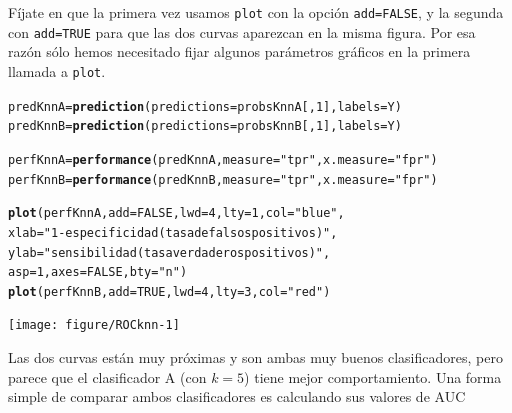 \documentclass[10pt,a4paper]{article}\usepackage[]{graphicx}\usepackage[]{color}
\makeatletter
\newcommand{\hlnum}[1]{\textcolor[rgb]{0.686,0.059,0.569}{#1}}%
\newcommand{\hlstr}[1]{\textcolor[rgb]{0.192,0.494,0.8}{#1}}%
\newcommand{\hlstd}[1]{\textcolor[rgb]{0.345,0.345,0.345}{#1}}%
\newcommand{\hlkwb}[1]{\textcolor[rgb]{0.69,0.353,0.396}{#1}}%
\newcommand{\hlkwc}[1]{\textcolor[rgb]{0.333,0.667,0.333}{#1}}%
\newcommand{\hlkwd}[1]{\textcolor[rgb]{0.737,0.353,0.396}{\textbf{#1}}}%
\newenvironment{kframe}{%
 \def\at@end@of@kframe{}%
 \ifinner\ifhmode%
  \def\at@end@of@kframe{\end{minipage}}%
  \begin{minipage}{\columnwidth}%
 \fi\fi%
 \def\FrameCommand##1{\hskip\@totalleftmargin \hskip-\fboxsep
 \colorbox{shadecolor}{##1}\hskip-\fboxsep
     \hskip-\linewidth \hskip-\@totalleftmargin \hskip\columnwidth}%
 \MakeFramed {\advance\hsize-\width
   \@totalleftmargin\z@ \linewidth\hsize
   \@setminipage}}%
 {\par\unskip\endMakeFramed%
 \at@end@of@kframe}
\newenvironment{knitrout}{}{} %
\makeatother
\begin{document}
Fíjate en que la primera vez usamos {\tt plot} con la opción {\tt add=FALSE}, y la segunda con {\tt add=TRUE} para que las dos curvas aparezcan en la misma figura. Por esa razón sólo hemos necesitado fijar algunos parámetros gráficos en la primera llamada a {\tt plot}.

\begin{knitrout}
\color{fgcolor}\begin{kframe}
\begin{alltt}
\hlstd{predKnnA} \hlkwb{=} \hlkwd{prediction}\hlstd{(}\hlkwc{predictions} \hlstd{= probsKnnA[,} \hlnum{1}\hlstd{],} \hlkwc{labels} \hlstd{= Y)}
\hlstd{predKnnB} \hlkwb{=} \hlkwd{prediction}\hlstd{(}\hlkwc{predictions} \hlstd{= probsKnnB[,} \hlnum{1}\hlstd{],} \hlkwc{labels} \hlstd{= Y)}

\hlstd{perfKnnA} \hlkwb{=} \hlkwd{performance}\hlstd{(predKnnA,} \hlkwc{measure}\hlstd{=}\hlstr{"tpr"}\hlstd{,} \hlkwc{x.measure}\hlstd{=}\hlstr{"fpr"}\hlstd{)}
\hlstd{perfKnnB} \hlkwb{=} \hlkwd{performance}\hlstd{(predKnnB,} \hlkwc{measure}\hlstd{=}\hlstr{"tpr"}\hlstd{,} \hlkwc{x.measure}\hlstd{=}\hlstr{"fpr"}\hlstd{)}

\hlkwd{plot}\hlstd{(perfKnnA,} \hlkwc{add} \hlstd{=}\hlnum{FALSE}\hlstd{,} \hlkwc{lwd}\hlstd{=}\hlnum{4}\hlstd{,} \hlkwc{lty}\hlstd{=}\hlnum{1}\hlstd{,} \hlkwc{col}\hlstd{=}\hlstr{"blue"}\hlstd{,}
      \hlkwc{xlab} \hlstd{=} \hlstr{"1 - especificidad (tasa de falsos positivos)"}\hlstd{,}
      \hlkwc{ylab} \hlstd{=} \hlstr{"sensibilidad (tasa verdaderos positivos)"}\hlstd{,}
      \hlkwc{asp}\hlstd{=}\hlnum{1}\hlstd{,} \hlkwc{axes}\hlstd{=}\hlnum{FALSE}\hlstd{,} \hlkwc{bty}\hlstd{=}\hlstr{"n"}\hlstd{)}
\hlkwd{plot}\hlstd{(perfKnnB,} \hlkwc{add} \hlstd{=}\hlnum{TRUE}\hlstd{,} \hlkwc{lwd}\hlstd{=}\hlnum{4}\hlstd{,} \hlkwc{lty}\hlstd{=}\hlnum{3}\hlstd{,} \hlkwc{col}\hlstd{=}\hlstr{"red"}\hlstd{)}
\end{alltt}
\end{kframe}

{\centering \texttt{[image: figure/ROCknn-1]} 

}



\end{knitrout}

Las dos curvas están muy próximas y son ambas muy buenos clasificadores, pero parece que el clasificador A (con $k=5$) tiene mejor comportamiento.  Una forma simple de comparar ambos clasificadores es calculando sus valores de AUC
\end{document}
